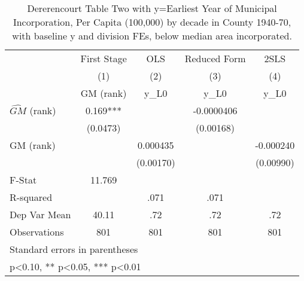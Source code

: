 \begin{table}[htbp]\centering
\def\sym#1{\ifmmode^{#1}\else\(^{#1}\)\fi}
\caption{Dererencourt Table Two with y=Earliest Year of Municipal Incorporation, Per Capita (100,000) by decade in County 1940-70, with baseline y and division FEs, below median area incorporated.}
\begin{tabular}{l*{4}{c}}
\toprule
                    & First Stage   &         OLS   &Reduced Form   &        2SLS   \\
                    &\multicolumn{1}{c}{(1)}&\multicolumn{1}{c}{(2)}&\multicolumn{1}{c}{(3)}&\multicolumn{1}{c}{(4)}\\
                    &\multicolumn{1}{c}{GM  (rank)}&\multicolumn{1}{c}{y\_L0}&\multicolumn{1}{c}{y\_L0}&\multicolumn{1}{c}{y\_L0}\\
\midrule
$\hat{GM}$ (rank)   &       0.169***&               &  -0.0000406   &               \\
                    &    (0.0473)   &               &   (0.00168)   &               \\
\addlinespace
GM  (rank)          &               &    0.000435   &               &   -0.000240   \\
                    &               &   (0.00170)   &               &   (0.00990)   \\
\midrule
F-Stat              &      11.769   &               &               &               \\
R-squared           &               &        .071   &        .071   &               \\
Dep Var Mean        &       40.11   &         .72   &         .72   &         .72   \\
Observations        &         801   &         801   &         801   &         801   \\
\bottomrule
\multicolumn{5}{l}{\footnotesize Standard errors in parentheses}\\
\multicolumn{5}{l}{\footnotesize * p<0.10, ** p<0.05, *** p<0.01}\\
\end{tabular}
\end{table}
